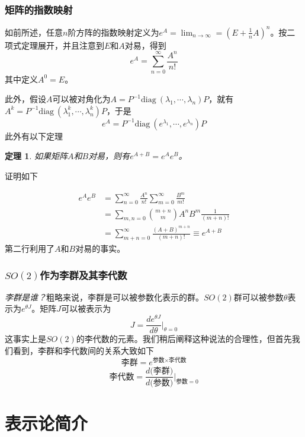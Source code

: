 \documentclass[a4paper,11pt]{ctexart}
\newcommand{\beq}{\begin{equation}}
\newcommand{\eeq}{\end{equation}}
\newcommand{\bea}{\begin{equation}\begin{aligned}}
\newcommand{\eea}{\end{aligned}\end{equation}}
\newcommand{\diag}{\mathrm{diag \ }}
\newtheorem{thm}{定理}[section]
\begin{document}
\subsubsection{矩阵的指数映射}
如前所述，任意$n$阶方阵的指数映射定义为$e^A = \lim_{n \to \infty} = (E + \frac{1}{n} A)^n$。按二项式定理展开，并且注意到$E$和$A$对易，得到
\beq
e^A= \sum_{n=0}^{\infty} \frac{A^n}{n!}
\eeq
其中定义$A^0 = E$。
\par
此外，假设$A$可以被对角化为$A = P^{-1} \diag (\lambda_1,\cdots,\lambda_n) P$，就有$A^k = P^{-1} \diag (\lambda_1^k,\cdots ,\lambda_n^k) P$，于是
\beq
e^A = P^{-1} \diag (e^{\lambda_1},\cdots,e^{\lambda_n}) P
\eeq
此外有以下定理
\begin{thm}
如果矩阵$A$和$B$对易，则有$e^{A+B} = e^Ae^B$。
\end{thm}
证明如下\par
\bea
e^A e^B &= \sum_{n=0}^{\infty} \frac{A^n}{n!} \sum_{m=0}^{\infty} \frac{B^m}{m!} \\
&= \sum_{m,n = 0} \binom{m+n}{m} A^n B^m     \frac{1}{(m+n)!} \\
&= \sum_{m+n = 0}^\infty \frac{(A+B)^{m+n}}{(m+n)!} \equiv e^{A+B}
\eea
第二行利用了$A$和$B$对易的事实。

\subsubsection{$SO(2)$作为李群及其李代数}
\emph{李群是谁？}粗略来说，李群是可以被参数化表示的群。$SO(2)$群可以被参数$\theta$表示为$e^{\theta J}$。矩阵$J$可以被表示为
\beq
J = \frac{d e^{\theta J}}{d \theta}\bigg|_{\theta = 0}
\eeq
这事实上是$SO(2)$的李代数的元素。我们稍后阐释这种说法的合理性，但首先我们看到，李群和李代数间的关系大致如下
\beq
\text{李群} = e^{\text{参数} \times \text{李代数}}
\eeq
\beq
\text{李代数} = \frac{d \text{(李群)}}{d \text{(参数)}} \bigg|_{\text{参数} = 0}
\eeq
\section{表示论简介}
\end{document}
